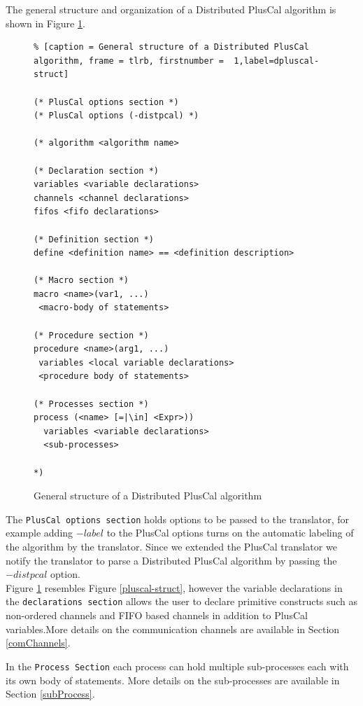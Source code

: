 \documentclass{thesul}
\begin{document}
The general structure and organization of a Distributed PlusCal algorithm is shown in Figure \ref{dpluscal-struct}.


\begin{figure}
\begin{lstlisting}% [caption = General structure of a Distributed PlusCal algorithm, frame = tlrb, firstnumber =  1,label=dpluscal-struct]

(* PlusCal options section *)
(* PlusCal options (-distpcal) *)

(* algorithm <algorithm name>

(* Declaration section *)
variables <variable declarations>
channels <channel declarations>
fifos <fifo declarations>

(* Definition section *)
define <definition name> == <definition description>

(* Macro section *)
macro <name>(var1, ...)
 <macro-body of statements>

(* Procedure section *)
procedure <name>(arg1, ...)
 variables <local variable declarations>
 <procedure body of statements>

(* Processes section *)
process (<name> [=|\in] <Expr>))
  variables <variable declarations>
  <sub-processes>

*)

\end{lstlisting}
\caption{General structure of a Distributed PlusCal algorithm}
\label{dpluscal-struct}
\end{figure}

The \verb|PlusCal options section| holds options to be passed to the translator, for example adding $-label$ to the PlusCal options turns on the automatic labeling of the algorithm by the translator. Since we extended the PlusCal translator we notify the translator to parse a Distributed PlusCal algorithm by passing the $-distpcal$ option.\\

Figure \ref{dpluscal-struct} resembles Figure \ref{pluscal-struct}, however the variable declarations in the \verb|declarations section| allows the user to declare primitive constructs such as non-ordered channels and FIFO based channels in addition to PlusCal variables.More details on the communication channels are available in Section \ref{comChannels}.

In the \verb|Process Section| each process can hold multiple sub-processes each with its own body of statements. More details on the sub-processes are available in Section \ref{subProcess}.
\end{document}
